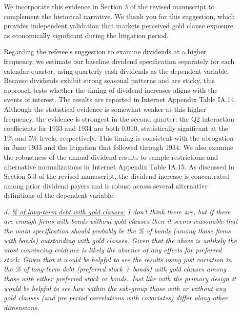 \begin{itemize}
    We incorporate this evidence in Section 3 of the revised manuscript to complement the historical narrative. We thank you for this suggestion, which provides independent validation that markets perceived gold clause exposure as economically significant during the litigation period.

    Regarding the referee's suggestion to examine dividends at a higher frequency, we estimate our baseline dividend specification separately for each calendar quarter, using quarterly cash dividends as the dependent variable. Because dividends exhibit strong seasonal patterns and are sticky, this approach tests whether the timing of dividend increases aligns with the events of interest. The results are reported in Internet Appendix Table IA.14. Although the statistical evidence is somewhat weaker at this higher frequency, the evidence is strongest in the second quarter: the Q2 interaction coefficients for 1933 and 1934 are both 0.010, statistically significant at the 1\% and 5\% levels, respectively. This timing is consistent with the abrogation in June 1933 and the litigation that followed through 1934. We also examine the robustness of the annual dividend results to sample restrictions and alternative normalizations in Internet Appendix Table IA.15. As discussed in Section 5.3 of the revised manuscript, the dividend increase is concentrated among prior dividend payers and is robust across several alternative definitions of the dependent variable.
    
    \bigskip
    
    \item[\textit{\textcolor{red!60!black}{d.}}] \textit{\textcolor{red!60!black}{
    \underline{\% of long-term debt with gold clauses:}
    I don't think there are, but if there are enough firms with bonds without gold clauses then it seems reasonable that the main specification should probably be the \% of bonds (among those firms with bonds) outstanding with gold clauses. Given that the above is unlikely the most convincing evidence is likely the absence of any effects for preferred stock. Given that it would be helpful to see the results using just variation in the \% of long-term debt (preferred stock + bonds) with gold clauses among those with either preferred stock or bonds. Just like with the primary design it would be helpful to see how within the sub-group those with or without any gold clauses (and pre period correlations with covariates) differ along other dimensions. 
    }}

    \bigskip



\end{itemize}
